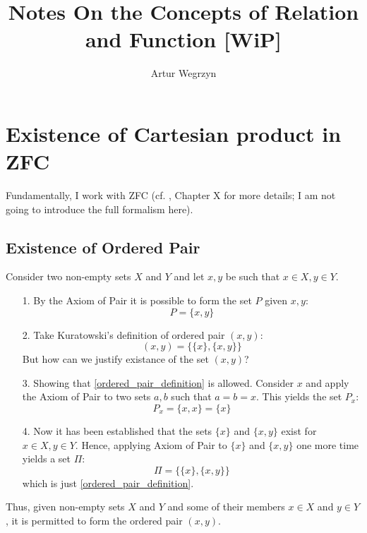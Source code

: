 \documentclass[12pt]{article}
\theoremstyle{plain}
\theoremstyle{definition}
\begin{document}
\title{Notes On the Concepts of Relation and Function [WiP]}
\author{Artur Wegrzyn}
\maketitle



\tableofcontents


\section{Existence of Cartesian product in ZFC}
Fundamentally, I work with ZFC (cf. \cite{suppes_axiomatic_set_theory}, Chapter X for 
more details; I am not going to introduce the full formalism here). 
\subsection{Existence of Ordered Pair}
Consider two non-empty sets $X$ and $Y$ and let $x, y$ be such that $x \in X, y \in Y$.  
\begin{itemize}
\item[1. ] By the Axiom of Pair it is possible to form the set $P$ given $x, y$:
\begin{equation*}
P = \{ x, y \}
\end{equation*}
\item[2. ] Take Kuratowski's definition of ordered pair $(x, y)$:
\begin{equation}
\label{ordered_pair_definition}
(x, y) = \{ \{ x \}, \{ x, y \} \}
\end{equation}
But how can we justify existance of the set $(x,y)$?
\item[3. ] Showing that \eqref{ordered_pair_definition} is allowed. Consider $x$ and 
apply the Axiom of Pair to two sets $a, b$ such that $a = b = x$. 
This yields the set $P_x$:
\begin{equation*}
P_x = \{ x, x \} = \{ x \}
\end{equation*}
\item[4. ] Now it has been established that the sets $\{ x \}$ and 
$ \{ x, y \}$ exist for $x \in X, y \in Y$. Hence, applying Axiom of Pair 
to $\{ x \}$ and $ \{ x, y \}$ one more time  yields a set $\Pi$:
\begin{equation*}
\Pi = \{ \{ x \}, \{ x, y \} \}
\end{equation*}
which is just \eqref{ordered_pair_definition}.
\end{itemize}
Thus, given non-empty sets $X$ and $Y$ and some of their members $x \in X$ and 
$y \in Y$, it is permitted to form the ordered pair $(x, y)$. 
\end{document}
